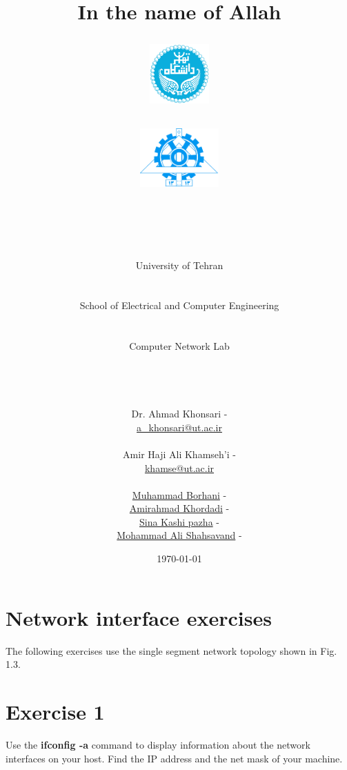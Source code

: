 \documentclass[10pt,a4paper]{article}
\title{
\normalsize In the name of Allah\\
\vspace{10pt}
\LARGE\FR{بسم \allah\  الرحمن الرحیم}
\vspace{10pt}
\begin{center}
    \begin{minipage}{0.48\textwidth}
        \begin{flushleft}
            \includegraphics[height=64pt,width=64pt]{../img/logo.png}
        \end{flushleft}
    \end{minipage}
    \begin{minipage}{0.48\textwidth}
        \begin{flushright}
            \includegraphics[height=64pt]{../img/eng-logo.png}
        \end{flushright}
    \end{minipage}
\end{center}
\vspace*{-64pt}
\huge \titleText\\
\vspace{40pt}
}
\author{
\huge University of Tehran\\
\LARGE \FR{دانشگاه تهران}\\
\\
\LARGE School of Electrical and Computer Engineering\\
\FR{دانشکده مهندسی برق و کامپیوتر}\\
\\
\Large Computer Network Lab\\
\FR{آزمایشگاه شبکه‌های کامپیوتری}\\
\\
\\
\\
\normalfont
Dr. Ahmad Khonsari - \FR{احمد خونساری}\\
\href{mailto:a_khonsari@ut.ac.ir}{a\_khonsari@ut.ac.ir}\\
\\
\normalsize
Amir Haji Ali Khamseh'i - \FR{امیر حاجی علی خمسه‌ء}\\
\href{mailto:khamse@ut.ac.ir}{khamse@ut.ac.ir}\\
\\
\normalsize \href{mailto:m.borhani@ut.ac.ir}{Muhammad Borhani} - \FR{محمد برهانی}\\
\normalsize \href{mailto:a.a.khordadi@ut.ac.ir}{Amirahmad Khordadi} - \FR{امیر احمد خردادی}\\
\normalsize \href{mailto:sina\_kashipazha@ut.ac.ir}{Sina Kashi pazha} - \FR{سینا کاشی پزها}\\
\normalsize \href{mailto:mashahsavand@ut.ac.ir}{Mohammad Ali Shahsavand} - \FR{محمد علی شاهسوند}
}
\date{\vspace{30pt}\today\\\vspace{10pt}{\selectlanguage{farsi}\today}}
\numberwithin{equation}{section}
\numberwithin{figure}{section}
\numberwithin{table}{section}
\begin{document}

    \maketitle


    \pagebreak





    \section*{Network interface exercises}
    The following exercises use the single segment network topology shown in Fig. 1.3.

    \section{ Exercise 1}
    Use the \textbf{ifconfig -a} command to display information about the network interfaces on your host.
    Find the IP address and the net mask of your machine.
\end{document}
